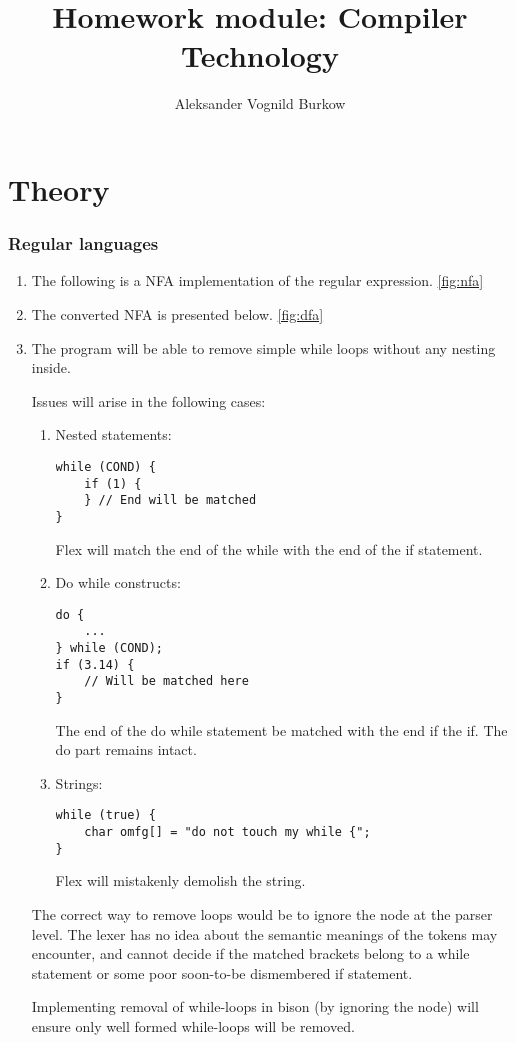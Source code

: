 \documentclass[a4paper]{article}
\title{Homework module: Compiler Technology}
\author{Aleksander Vognild Burkow}
\begin{document}
\maketitle
\thispagestyle{empty}
\newpage

\part{Theory}
\section{Regular languages}

\begin{enumerate}[label=\alph*)]
\item
    The following is a NFA implementation of the regular expression. \ref{fig:nfa}
    

\item
    The converted NFA is presented below. \ref{fig:dfa}
    

\item
    The program will be able to remove simple while loops without any nesting inside.

    Issues will arise in the following cases:
    \begin{enumerate}[label=\roman*]
    \item
    Nested statements:

\begin{lstlisting}
while (COND) {
    if (1) {
    } // End will be matched
}
\end{lstlisting}

    Flex will match the end of the while with the end of the if statement.

    \item
    Do while constructs:
\begin{lstlisting}
do {
    ...
} while (COND);
if (3.14) {
    // Will be matched here
}
\end{lstlisting}

    The end of the do while statement be matched with the end if the if. The do part remains intact.

    \item
    Strings:

\begin{lstlisting}
while (true) {
    char omfg[] = "do not touch my while {";
}
\end{lstlisting}

    Flex will mistakenly demolish the string.
    \end{enumerate}

The correct way to remove loops would be to ignore the node at the parser level. The lexer has no idea about the semantic meanings of the tokens may encounter, and cannot decide if the matched brackets belong to a while statement or some poor soon-to-be dismembered if statement.

Implementing removal of while-loops in bison (by ignoring the node) will ensure only well formed while-loops will be removed.


\end{enumerate}
\end{document}
